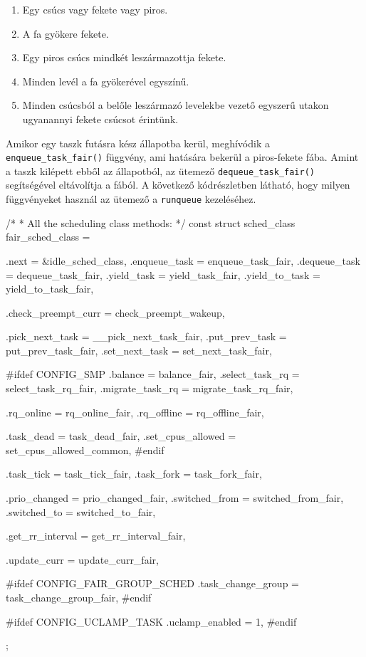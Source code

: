 \begin{enumerate}
	\item Egy csúcs vagy fekete vagy piros.
	\item A fa gyökere fekete.
	\item Egy piros csúcs mindkét leszármazottja fekete.
	\item Minden levél a fa gyökerével egyszínű. 
	\item Minden csúcsból a belőle leszármazó levelekbe vezető egyszerű utakon ugyanannyi fekete csúcsot érintünk.
\end{enumerate}

Amikor egy taszk futásra kész állapotba kerül, meghívódik a \texttt{enqueue\_task\_fair()}  függvény, ami hatására bekerül a piros-fekete fába. Amint a taszk kilépett ebből az állapotból, az ütemező \texttt{dequeue\_task\_fair()} segítségével eltávolítja a fából.
A következő kódrészletben látható, hogy milyen függvényeket használ az ütemező a \texttt{runqueue} kezeléséhez.

\begin{cpp}
/*
 * All the scheduling class methods:
 */
const struct sched_class fair_sched_class = {
	.next			= &idle_sched_class,
	.enqueue_task		= enqueue_task_fair,
	.dequeue_task		= dequeue_task_fair,
	.yield_task		= yield_task_fair,
	.yield_to_task		= yield_to_task_fair,

	.check_preempt_curr	= check_preempt_wakeup,

	.pick_next_task		= __pick_next_task_fair,
	.put_prev_task		= put_prev_task_fair,
	.set_next_task          = set_next_task_fair,

#ifdef CONFIG_SMP
	.balance		= balance_fair,
	.select_task_rq		= select_task_rq_fair,
	.migrate_task_rq	= migrate_task_rq_fair,

	.rq_online		= rq_online_fair,
	.rq_offline		= rq_offline_fair,

	.task_dead		= task_dead_fair,
	.set_cpus_allowed	= set_cpus_allowed_common,
#endif

	.task_tick		= task_tick_fair,
	.task_fork		= task_fork_fair,

	.prio_changed		= prio_changed_fair,
	.switched_from		= switched_from_fair,
	.switched_to		= switched_to_fair,

	.get_rr_interval	= get_rr_interval_fair,

	.update_curr		= update_curr_fair,

#ifdef CONFIG_FAIR_GROUP_SCHED
	.task_change_group	= task_change_group_fair,
#endif

#ifdef CONFIG_UCLAMP_TASK
	.uclamp_enabled		= 1,
#endif
};
\end{cpp}

